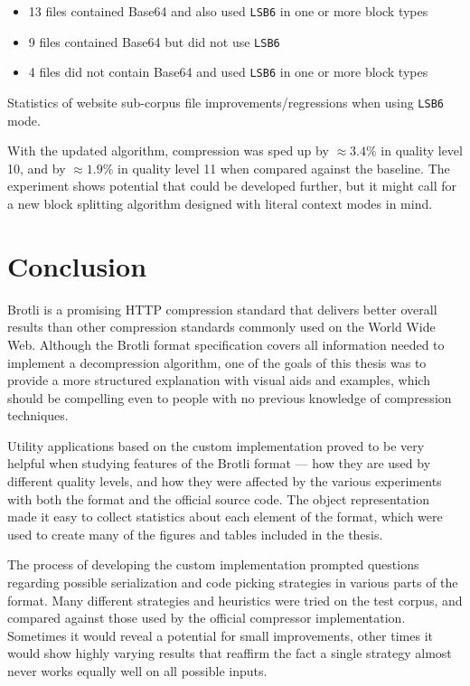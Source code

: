 \documentclass[english,master,dept460,male,cpp,cpdeclaration]{diploma}
\newcommand{\nosep}{\itemsep0em}
\newcommand{\texfigure}[1]{
}
\begin{document}
			\begin{itemize} \nosep
				\item 13 files contained Base64 and also used \verb|LSB6| in one or more block types
				\item 9 files contained Base64 but did not use \verb|LSB6|
				\item 4 files did not contain Base64 and used \verb|LSB6| in one or more block types
			\end{itemize}
			
			\begin{table}[H]
				\centering
				\caption{Statistics of website sub-corpus file improvements/regressions when using \texttt{LSB6} mode.}
				\label{table:multi-lcm-base64-details}
				\texfigure{multi-lcm-base64-details}
			\end{table}
			
			\noindent
			With the updated algorithm, compression was sped up by $\approx 3.4 \%$ in quality level 10, and by $\approx 1.9 \%$ in quality level 11 when compared against the baseline. The experiment shows potential that could be developed further, but it might call for a new block splitting algorithm designed with literal context modes in mind.

\section{Conclusion}

Brotli is a promising HTTP compression standard that delivers better overall results than other compression standards commonly used on the World Wide Web. Although the Brotli format specification\cite{RFC7932} covers all information needed to implement a decompression algorithm, one of the goals of this thesis was to provide a more structured explanation with visual aids and examples, which should be compelling even to people with no previous knowledge of compression techniques.

Utility applications based on the custom implementation proved to be very helpful when studying features of the Brotli format --- how they are used by different quality levels, and how they were affected by the various experiments with both the format and the official source code. The object representation made it easy to collect statistics about each element of the format, which were used to create many of the figures and tables included in the thesis.

The process of developing the custom implementation prompted questions regarding possible serialization and code picking strategies in various parts of the format. Many different strategies and heuristics were tried on the test corpus, and compared against those used by the official compressor implementation. Sometimes it would reveal a potential for small improvements, other times it would show highly varying results that reaffirm the fact a single strategy almost never works equally well on all possible inputs.
\end{document}
